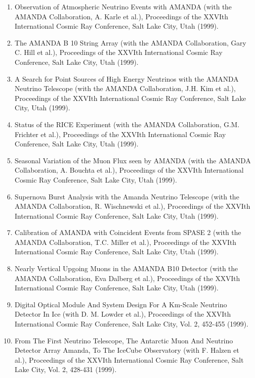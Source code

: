 \begin{enumerate}
\item Observation of Atmospheric Neutrino Events with AMANDA (with the AMANDA Collaboration, A. Karle et al.), Proceedings of the XXVIth International Cosmic Ray Conference, Salt Lake City, Utah (1999).

\item The AMANDA B 10 String Array (with the AMANDA Collaboration, Gary C. Hill et al.), Proceedings of the XXVIth International Cosmic Ray Conference, Salt Lake City, Utah (1999).

\item A Search for Point Sources of High Energy Neutrinos with the AMANDA Neutrino Telescope (with the AMANDA Collaboration, J.H. Kim et al.), Proceedings of the XXVIth International Cosmic Ray Conference, Salt Lake City, Utah (1999).

\item Status of the RICE Experiment (with the AMANDA Collaboration, G.M. Frichter et al.), Proceedings of the XXVIth International Cosmic Ray Conference, Salt Lake City, Utah (1999).

\item Seasonal Variation of the Muon Flux seen by AMANDA (with the AMANDA Collaboration, A. Bouchta et al.), Proceedings of the XXVIth International Cosmic Ray Conference, Salt Lake City, Utah (1999).

\item Supernova Burst Analysis with the Amanda Neutrino Telescope (with the AMANDA Collaboration, R. Wischnewski et al.), Proceedings of the XXVIth International Cosmic Ray Conference, Salt Lake City, Utah (1999).

\item Calibration of AMANDA with Coincident Events from SPASE 2 (with the AMANDA Collaboration, T.C. Miller et al.), Proceedings of the XXVIth International Cosmic Ray Conference, Salt Lake City, Utah (1999).

\item Nearly Vertical Upgoing Muons in the AMANDA B10 Detector (with the AMANDA Collaboration, Eva Dalberg et al.), Proceedings of the XXVIth International Cosmic Ray Conference, Salt Lake City, Utah (1999).

\item Digital Optical Module And System Design For A Km-Scale Neutrino Detector In Ice (with D. M. Lowder et al.), Proceedings of the XXVIth International Cosmic Ray Conference, Salt Lake City, Vol. 2, 452-455 (1999).

\item From The First Neutrino Telescope, The Antarctic Muon And Neutrino Detector Array Amanda, To The IceCube Observatory (with F. Halzen et al.), Proceedings of the XXVIth International Cosmic Ray Conference, Salt Lake City, Vol. 2, 428-431 (1999).


\end{enumerate}
